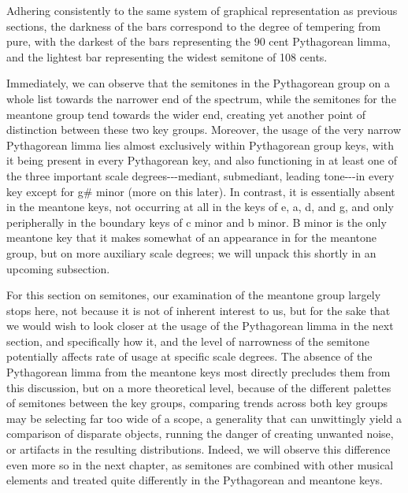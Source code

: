     \begin{center}
    \end{center}
    


    \begin{center}
    \end{center}
    
    Adhering consistently to the same system of graphical representation as
previous sections, the darkness of the bars correspond to the degree of
tempering from pure, with the darkest of the bars representing the 90
cent Pythagorean limma, and the lightest bar representing the widest
semitone of 108 cents.

Immediately, we can observe that the semitones in the Pythagorean group
on a whole list towards the narrower end of the spectrum, while the
semitones for the meantone group tend towards the wider end, creating
yet another point of distinction between these two key groups. Moreover,
the usage of the very narrow Pythagorean limma lies almost exclusively
within Pythagorean group keys, with it being present in every
Pythagorean key, and also functioning in at least one of the three
important scale degrees-\/-\/-mediant, submediant, leading tone-\/-\/-in
every key except for g\# minor (more on this later). In contrast, it is
essentially absent in the meantone keys, not occurring at all in the
keys of e, a, d, and g, and only peripherally in the boundary keys of c
minor and b minor. B minor is the only meantone key that it makes
somewhat of an appearance in for the meantone group, but on more
auxiliary scale degrees; we will unpack this shortly in an upcoming
subsection.

For this section on semitones, our examination of the meantone group
largely stops here, not because it is not of inherent interest to us,
but for the sake that we would wish to look closer at the usage of the
Pythagorean limma in the next section, and specifically how it, and the
level of narrowness of the semitone potentially affects rate of usage at
specific scale degrees. The absence of the Pythagorean limma from the
meantone keys most directly precludes them from this discussion, but on
a more theoretical level, because of the different palettes of semitones
between the key groups, comparing trends across both key groups may be
selecting far too wide of a scope, a generality that can unwittingly
yield a comparison of disparate objects, running the danger of creating
unwanted noise, or artifacts in the resulting distributions. Indeed, we
will observe this difference even more so in the next chapter, as
semitones are combined with other musical elements and treated quite
differently in the Pythagorean and meantone keys.

